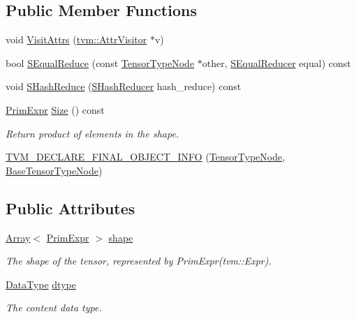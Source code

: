 \subsection*{Public Member Functions}
\begin{DoxyCompactItemize}
\item 
void \hyperlink{classtvm_1_1TensorTypeNode_a49f67378d6735693e24fb7b61c725132}{Visit\+Attrs} (\hyperlink{classtvm_1_1AttrVisitor}{tvm\+::\+Attr\+Visitor} $\ast$v)
\item 
bool \hyperlink{classtvm_1_1TensorTypeNode_af38f7e3df5a2beaec7190eb037bf89e9}{S\+Equal\+Reduce} (const \hyperlink{classtvm_1_1TensorTypeNode}{Tensor\+Type\+Node} $\ast$other, \hyperlink{classtvm_1_1SEqualReducer}{S\+Equal\+Reducer} equal) const 
\item 
void \hyperlink{classtvm_1_1TensorTypeNode_ab79c6efa74f976b6a515860b622b485e}{S\+Hash\+Reduce} (\hyperlink{classtvm_1_1SHashReducer}{S\+Hash\+Reducer} hash\+\_\+reduce) const 
\item 
\hyperlink{classtvm_1_1PrimExpr}{Prim\+Expr} \hyperlink{classtvm_1_1TensorTypeNode_ac69ea89085f16b718fe3c4525e1798ba}{Size} () const 
\begin{DoxyCompactList}\small\item\em Return product of elements in the shape. \end{DoxyCompactList}\item 
\hyperlink{classtvm_1_1TensorTypeNode_a96eab1328e646dba6c954b552766c5c4}{T\+V\+M\+\_\+\+D\+E\+C\+L\+A\+R\+E\+\_\+\+F\+I\+N\+A\+L\+\_\+\+O\+B\+J\+E\+C\+T\+\_\+\+I\+N\+FO} (\hyperlink{classtvm_1_1TensorTypeNode}{Tensor\+Type\+Node}, \hyperlink{classtvm_1_1BaseTensorTypeNode}{Base\+Tensor\+Type\+Node})
\end{DoxyCompactItemize}
\subsection*{Public Attributes}
\begin{DoxyCompactItemize}
\item 
\hyperlink{classtvm_1_1Array}{Array}$<$ \hyperlink{classtvm_1_1PrimExpr}{Prim\+Expr} $>$ \hyperlink{classtvm_1_1TensorTypeNode_a98fa347833e4504dd6f8056d9863a708}{shape}
\begin{DoxyCompactList}\small\item\em The shape of the tensor, represented by Prim\+Expr(tvm\+::\+Expr). \end{DoxyCompactList}\item 
\hyperlink{namespacetvm_a41918af1a1dc386388639a9d3ad06c5d}{Data\+Type} \hyperlink{classtvm_1_1TensorTypeNode_a715d148ed0f0fdc8bf975bb31e210975}{dtype}
\begin{DoxyCompactList}\small\item\em The content data type. \end{DoxyCompactList}\end{DoxyCompactItemize}
